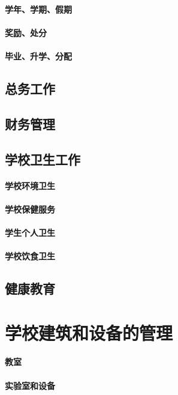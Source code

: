 \documentclass[UTF8]{../../ApplicationUniverse}
\begin{document}
    \subsubsection{学年、学期、假期}
    \subsubsection{奖励、处分}
    \subsubsection{毕业、升学、分配}
\section{总务工作}
\section{财务管理}
\section{学校卫生工作}
    \subsubsection{学校环境卫生}
    \subsubsection{学校保健服务}
    \subsubsection{学生个人卫生}
    \subsubsection{学校饮食卫生}
\section{健康教育}




\chapter{学校建筑和设备的管理}
    \subsubsection{教室}
    \subsubsection{实验室和设备}
\end{document}
